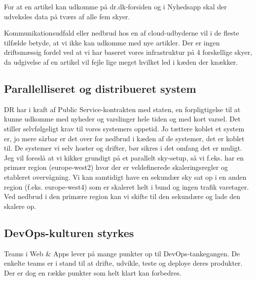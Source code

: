 \documentclass{article}
\begin{document}
For at en artikel kan udkomme på dr.dk-forsiden og i Nyhedsapp skal der udveksles data på tværs af alle fem skyer.

Kommunikationsudfald eller nedbrud hos en af cloud-udbyderne vil i de fleste tilfælde betyde, at vi ikke kan udkomme med nye artikler. Der er ingen driftsmæssig fordel ved at vi har baseret vores infrastruktur på 4 forskellige skyer, da udgivelse af en artikel vil fejle lige meget hvilket led i kæden der knækker. 

\subsection{Parallelliseret og distribueret system}
DR har i kraft af Public Service-kontrakten med staten, en forpligtigelse til at kunne udkomme med nyheder og varslinger hele tiden og med kort varsel.
Det stiller selvfølgeligt krav til vores systemers oppetid. Jo tættere koblet et system er, jo mere sårbar er det over for nedbrud i kæden af de systemer, det er koblet til.
De systemer vi selv hoster og drifter, bør sikres i det omfang det er muligt. Jeg vil foreslå at vi kikker grundigt på et parallelt sky-setup, så vi f.eks. har en primær region (europe-west2) hvor der er veldefinerede skaleringsregler og etableret overvågning.
Vi kan samtidigt have en sekundær sky sat op i en anden region (f.eks. europe-west4) som er skaleret helt i bund og ingen trafik varetager.
Ved nedbrud i den primære region kan vi skifte til den sekundære og lade den skalere op.



\subsection{DevOps-kulturen styrkes}
Teams i Web \& Apps lever på mange punkter op til DevOps-tankegangen. De enkelte teams er i stand til at drifte, udvikle, teste og deploye deres produkter.  Der er dog en række punkter som helt klart kan forbedres.
\end{document}
